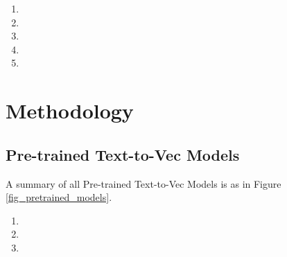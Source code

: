 \documentclass[conference]{IEEEtran}
\begin{document}
\begin{enumerate}

    \item 
    
    \item
    
    \item
    
    \item
    
    \item

\end{enumerate}


\section{Methodology} \label{sec:meth}


\subsection{Pre-trained Text-to-Vec Models}



A summary of all Pre-trained Text-to-Vec Models is as in Figure \ref{fig_pretrained_models}.


\begin{enumerate}
    \item 
    
    
    \item 
    
    
    \item 
    
    
\end{enumerate}
\end{document}
